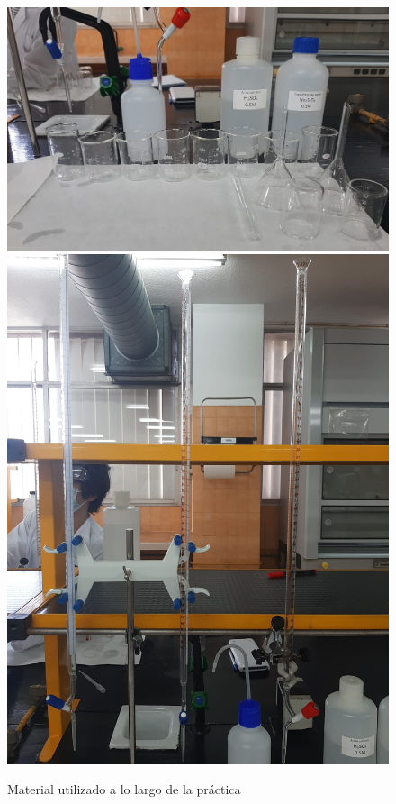 \begin{figure}[H]
    \centering
    \hspace*{-3cm}
        \includegraphics[scale = 0.2]{prac7/Inventario Todo.jpeg}
        \includegraphics[scale = 0.093]{prac7/Buretas.jpeg}
    \hspace*{-3cm}
    \caption{Material utilizado a lo largo de la práctica}
    \vspace{-2cm}
\end{figure}
\clearpage

